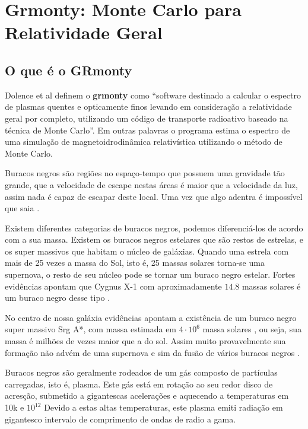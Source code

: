 \chapter{Grmonty: Monte Carlo para Relatividade Geral}
\label{cap:grmonty}

\section{O que é o GRmonty}
  Dolence et al definem o \textbf{grmonty} como ``software destinado a calcular o espectro de plasmas quentes e opticamente finos levando em consideração a relatividade geral por completo, utilizando um código de transporte radioativo baseado na técnica de Monte Carlo''\citep[p.1, traduzido]{Dolence:09}. Em outras palavras o programa estima o espectro de uma simulação de magnetoidrodinâmica \cite{eletro-hidro-dynamic:42} relativística utilizando o método de Monte Carlo.

  Buracos negros são regiões no espaço-tempo que possuem uma gravidade tão grande, que a velocidade de escape nestas áreas é maior que a velocidade da luz, assim nada é capaz de escapar deste local. Uma vez que algo adentra é impossível que saia \cite{fatalgravity:10}.

  Existem diferentes categorias de buracos negros, podemos diferenciá-los de acordo com a sua massa. Existem os buracos negros estelares que são restos de estrelas, e os super massivos que habitam o núcleo de galáxias. Quando uma estrela com mais de 25 vezes a massa do Sol, isto é, 25 massas solares torna-se uma supernova, o resto de seu núcleo pode se tornar um buraco negro estelar. Fortes evidências apontam que Cygnus X-1 com aproximadamente $14.8$ massas solares é um buraco negro desse tipo \cite{cygx1:11}.

  No centro de nossa galáxia evidências apontam a existência de um buraco negro super massivo Srg A*, com massa estimada em $4 \cdot 10^6$ massa solares \cite{2016ApJ...830...17B}, ou seja, sua massa é milhões de vezes maior que a do sol. Assim muito provavelmente sua formação não advém de uma supernova e sim da fusão de vários buracos negros \cite{fatalgravity:10}.

  Buracos negros são geralmente rodeados de um gás composto de partículas carregadas, isto é, plasma. Este gás está em rotação ao seu redor disco de acresção, submetido a gigantescas acelerações e aquecendo a temperaturas  em 10k e $10^{12}$ Devido a estas altas temperaturas, este plasma emiti radiação em gigantesco intervalo de comprimento de ondas de radio a gama.
  
